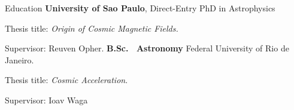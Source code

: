 \begin{rubric}{Education}
 \entry*[2004 -- 2009]%
	\textbf{University of Sao Paulo},{ Direct-Entry PhD in Astrophysics} 
	\par Thesis title: \emph{Origin of Cosmic Magnetic Fields.}
    \par Supervisor: Reuven Opher.
%
\entry*[1999 -- 2004]%
	\textbf{B.Sc.~ Astronomy} Federal University of Rio de Janeiro.
	\par Thesis title: \emph{Cosmic Acceleration}.
	\par Supervisor: Ioav Waga
\end{rubric}



